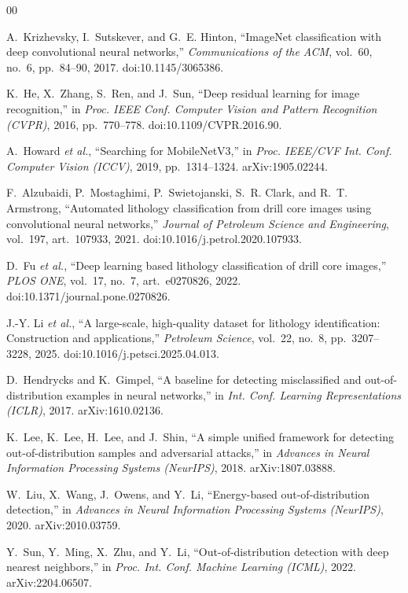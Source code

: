 \documentclass[journal]{IEEEtran}
\begin{document}
\balance

\begin{thebibliography}{00}

 A.~Krizhevsky, I.~Sutskever, and G.~E. Hinton, ``ImageNet classification with deep
convolutional neural networks,'' \emph{Communications of the ACM}, vol.~60, no.~6, pp.~84--90, 2017.
doi:10.1145/3065386.

 K.~He, X.~Zhang, S.~Ren, and J.~Sun, ``Deep residual learning for image recognition,'' in \emph{Proc.
IEEE Conf. Computer Vision and Pattern Recognition (CVPR)}, 2016, pp.~770--778. doi:10.1109/CVPR.2016.90.

 A.~Howard \emph{et al.}, ``Searching for MobileNetV3,'' in \emph{Proc. IEEE/CVF Int. Conf.
Computer Vision (ICCV)}, 2019, pp.~1314--1324. arXiv:1905.02244.

 F.~Alzubaidi, P.~Mostaghimi, P.~Swietojanski, S.~R. Clark, and R.~T. Armstrong, ``Automated
lithology classification from drill core images using convolutional neural networks,'' \emph{Journal of Petroleum
Science and Engineering}, vol.~197, art.~107933, 2021. doi:10.1016/j.petrol.2020.107933.

 D.~Fu \emph{et al.}, ``Deep learning based lithology classification of drill core images,'' \emph{PLOS
ONE}, vol.~17, no.~7, art.~e0270826, 2022. doi:10.1371/journal.pone.0270826.

 J.-Y. Li \emph{et al.}, ``A large-scale, high-quality dataset for lithology identification:
Construction and applications,'' \emph{Petroleum Science}, vol.~22, no.~8, pp.~3207--3228, 2025.
doi:10.1016/j.petsci.2025.04.013.

 D.~Hendrycks and K.~Gimpel, ``A baseline for detecting misclassified and out-of-distribution
examples in neural networks,'' in \emph{Int. Conf. Learning Representations (ICLR)}, 2017. arXiv:1610.02136.

 K.~Lee, K.~Lee, H.~Lee, and J.~Shin, ``A simple unified framework for detecting out-of-distribution
samples and adversarial attacks,'' in \emph{Advances in Neural Information Processing Systems (NeurIPS)}, 2018.
arXiv:1807.03888.

 W.~Liu, X.~Wang, J.~Owens, and Y.~Li, ``Energy-based out-of-distribution detection,'' in
\emph{Advances in Neural Information Processing Systems (NeurIPS)}, 2020. arXiv:2010.03759.

 Y.~Sun, Y.~Ming, X.~Zhu, and Y.~Li, ``Out-of-distribution detection with deep nearest neighbors,'' in
\emph{Proc. Int. Conf. Machine Learning (ICML)}, 2022. arXiv:2204.06507.

\end{thebibliography}
\end{document}
